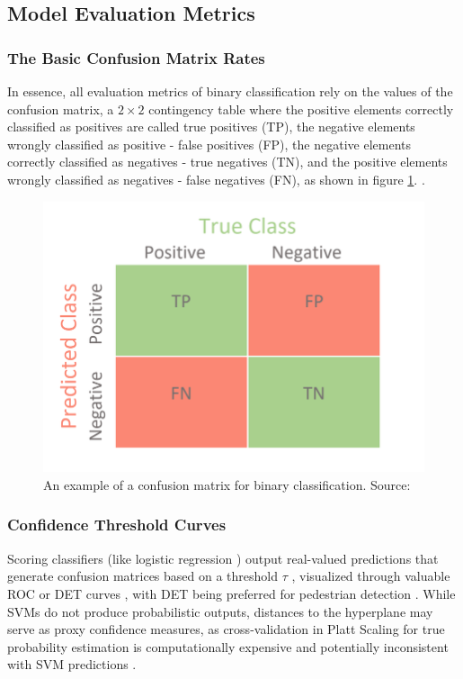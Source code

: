 \subsection{Model Evaluation Metrics}

\subsubsection{The Basic Confusion Matrix Rates}\label{sec:confusion-matrix}
In essence, all evaluation metrics of binary classification rely on the values of the confusion matrix, a $2 \times 2$ contingency table where the positive elements correctly classified as positives are called true positives (TP), the negative elements wrongly classified as positive - false positives (FP), the negative elements correctly classified as negatives - true negatives (TN), and the positive elements wrongly classified as negatives - false negatives (FN), as shown in figure \ref{fig:conf_matrix}. \cite{chicco_eval_2023}. 

\begin{figure}
    \centering
    \includegraphics[width=0.5\linewidth]{images/conf_matrix.png}
    \caption{An example of a confusion matrix for binary classification. Source: \cite{conf_matrix}}
    \label{fig:conf_matrix}
\end{figure}

\subsubsection{Confidence Threshold Curves}

Scoring classifiers (like logistic regression \cite{cornell_log_regression_notes}) output real-valued predictions that generate confusion matrices based on a threshold $\tau$ \cite{chicco_jurman_2020_mcc_f1}, visualized through valuable ROC or DET curves \cite{martin1997det}, with DET being preferred for pedestrian detection \cite{dalal_2005_histograms} \cite{dollar_2012_pedestrian}. While SVMs do not produce probabilistic outputs, distances to the hyperplane may serve as proxy confidence measures, as cross-validation in Platt Scaling \cite{platt1999probabilistic} for true probability estimation is computationally expensive and potentially inconsistent with SVM predictions \cite{scikit-learn_svm}.

